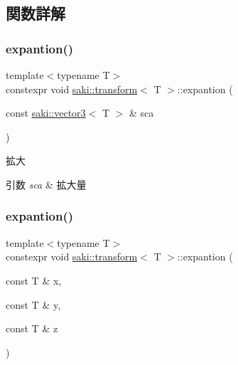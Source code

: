 \subsection{関数詳解}
\mbox{\label{classsaki_1_1transform_acb1e4cc039b689a97ed4098f566c7907}} 
\subsubsection{\texorpdfstring{expantion()}{expantion()}\hspace{0.1cm}{\footnotesize\ttfamily [1/2]}}
{\footnotesize\ttfamily template$<$typename T$>$ \\
constexpr void \mbox{\hyperlink{classsaki_1_1transform}{saki\+::transform}}$<$ T $>$\+::expantion (\begin{DoxyParamCaption}\item[{const \mbox{\hyperlink{classsaki_1_1vector3}{saki\+::vector3}}$<$ T $>$ \&}]{sca }\end{DoxyParamCaption})\hspace{0.3cm}{\ttfamily [inline]}}



拡大 


\begin{DoxyParams}{引数}
{\em sca} & 拡大量 \\
\hline
\end{DoxyParams}
\mbox{\label{classsaki_1_1transform_ab6c97d4f30cc45b1dc1d200ce7a0c483}} 
\subsubsection{\texorpdfstring{expantion()}{expantion()}\hspace{0.1cm}{\footnotesize\ttfamily [2/2]}}
{\footnotesize\ttfamily template$<$typename T$>$ \\
constexpr void \mbox{\hyperlink{classsaki_1_1transform}{saki\+::transform}}$<$ T $>$\+::expantion (\begin{DoxyParamCaption}\item[{const T \&}]{x,  }\item[{const T \&}]{y,  }\item[{const T \&}]{z }\end{DoxyParamCaption})\hspace{0.3cm}{\ttfamily [inline]}}



